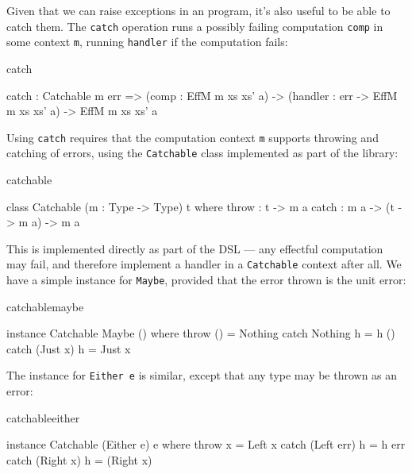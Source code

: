 \noindent
Given that we can raise exceptions in an \Eff{} program, it's also useful to be
able to catch them. The \texttt{catch} operation runs a possibly failing
computation \texttt{comp} in some context \texttt{m}, running \texttt{handler}
if the computation fails:

\begin{SaveVerbatim}{catch}

catch : Catchable m err =>
        (comp : EffM m xs xs' a) -> 
        (handler : err -> EffM m xs xs' a) ->
        EffM m xs xs' a

\end{SaveVerbatim}

\noindent
Using \texttt{catch} requires that the computation context \texttt{m} supports
throwing and catching of errors, using the \texttt{Catchable} class implemented
as part of the \Idris{} library:

\begin{SaveVerbatim}{catchable}

class Catchable (m : Type -> Type) t where
    throw : t -> m a
    catch : m a -> (t -> m a) -> m a

\end{SaveVerbatim}

\noindent
This is implemented directly as part of the \Eff{} DSL --- any effectful
computation may fail, and therefore implement a handler in a \texttt{Catchable}
context after all. We have a simple instance for \texttt{Maybe}, provided that
the error thrown is the unit error:

\begin{SaveVerbatim}{catchablemaybe}

instance Catchable Maybe () where
    throw () = Nothing
    catch Nothing  h = h ()
    catch (Just x) h = Just x

\end{SaveVerbatim}

\noindent
The instance for \texttt{Either e} is similar, except that any type may be
thrown as an error:

\begin{SaveVerbatim}{catchableeither}

instance Catchable (Either e) e where
    throw x = Left x
    catch (Left err) h = h err
    catch (Right x)  h = (Right x)

\end{SaveVerbatim}

